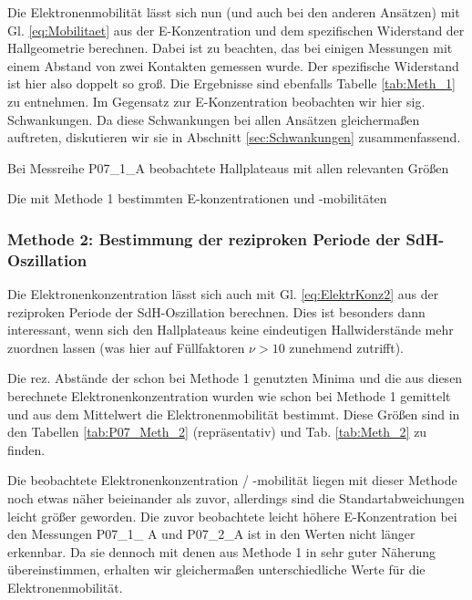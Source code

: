 Die Elektronenmobilität lässt sich nun (und auch bei den anderen Ansätzen) mit Gl. \ref{eq:Mobilitaet} aus der E-Konzentration und dem spezifischen Widerstand der Hallgeometrie berechnen. Dabei ist zu beachten, das bei einigen Messungen mit einem Abstand von zwei Kontakten gemessen wurde. Der spezifische Widerstand ist hier also doppelt so groß. Die Ergebnisse sind ebenfalls Tabelle \ref{tab:Meth_1} zu entnehmen. Im Gegensatz zur E-Konzentration beobachten wir hier sig. Schwankungen. Da diese Schwankungen bei allen Ansätzen gleichermaßen auftreten, diskutieren wir sie in Abschnitt \ref{sec:Schwankungen} zusammenfassend.

\begin{table}
	\centering
	\caption{Bei Messreihe P07\_1\_A beobachtete Hallplateaus mit allen relevanten Größen}
	
	\label{tab:P07_Meth_1}
\end{table}
\begin{table}
	\centering
	\caption{Die mit Methode 1 bestimmten E-konzentrationen und -mobilitäten}
	
	\label{tab:Meth_1}
\end{table}

\newpage
\subsubsection{Methode 2: Bestimmung der reziproken Periode der SdH-Oszillation} \label{subsubsec:Meth_2}
Die Elektronenkonzentration lässt sich auch mit Gl. \ref{eq:ElektrKonz2} aus der reziproken Periode der SdH-Oszillation berechnen. Dies ist besonders dann interessant, wenn sich den Hallplateaus keine eindeutigen Hallwiderstände mehr zuordnen lassen (was hier auf Füllfaktoren $\nu > 10$ zunehmend zutrifft).

Die rez. Abstände der schon bei Methode 1 genutzten Minima und die aus diesen berechnete Elektronenkonzentration wurden wie schon bei Methode 1 gemittelt und aus dem Mittelwert die Elektronenmobilität bestimmt. Diese Größen sind in den Tabellen \ref{tab:P07_Meth_2} (repräsentativ) und Tab. \ref{tab:Meth_2} zu finden. 

Die beobachtete Elektronenkonzentration / -mobilität liegen mit dieser Methode noch etwas näher beieinander als zuvor, allerdings sind die Standartabweichungen leicht größer geworden. Die zuvor beobachtete leicht höhere E-Konzentration bei den Messungen P07\_1\_ A und P07\_2\_A ist in den Werten nicht länger erkennbar. Da sie dennoch mit denen aus Methode 1 in sehr guter Näherung übereinstimmen, erhalten wir gleichermaßen unterschiedliche Werte für die Elektronenmobilität.
 
